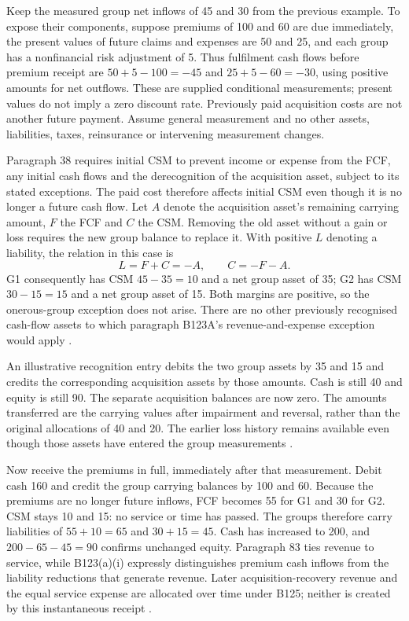 Keep the measured group net inflows of 45 and 30 from the previous example.
To expose their components, suppose premiums of 100 and 60 are due immediately,
the present values of future claims and expenses are 50 and 25, and each
group has a nonfinancial risk adjustment of 5. Thus fulfilment cash flows
before premium receipt are $50+5-100=-45$ and $25+5-60=-30$, using positive
amounts for net outflows. These are supplied conditional measurements;
present values do not imply a zero discount rate. Previously paid acquisition
costs are not another future payment. Assume general measurement and no other
assets, liabilities, taxes, reinsurance or intervening measurement changes.

Paragraph 38 requires initial CSM to prevent income or expense from the FCF,
any initial cash flows and the derecognition of the acquisition asset, subject
to its stated exceptions. The paid cost therefore affects initial CSM even
though it is no longer a future cash flow. Let $A$ denote the acquisition
asset's remaining carrying amount, $F$ the FCF and $C$ the CSM. Removing the
old asset without a gain or loss requires the new group balance to replace it.
With positive $L$ denoting a liability, the relation in this case is
\[
 L=F+C=-A,\qquad C=-F-A.
\]
G1 consequently has CSM $45-35=10$ and a net group asset of 35; G2 has CSM
$30-15=15$ and a net group asset of 15. Both margins are positive, so the
onerous-group exception does not arise. There are no other previously
recognised cash-flow assets to which paragraph B123A's revenue-and-expense
exception would apply \citep[paragraphs 28C, 32, 38, 47 and B123A]{aasb17}.

An illustrative recognition entry debits the two group assets by 35 and 15
and credits the corresponding acquisition assets by those amounts. Cash is
still 40 and equity is still 90. The separate acquisition balances are now
zero. The amounts transferred are the carrying values after impairment and
reversal, rather than the original allocations of 40 and 20. The earlier
loss history remains available even though those assets have entered the
group measurements \citep[paragraphs 28C--28D and B35C]{aasb17}.

Now receive the premiums in full, immediately after that measurement. Debit
cash 160 and credit the group carrying balances by 100 and 60. Because the
premiums are no longer future inflows, FCF becomes 55 for G1 and 30 for G2.
CSM stays 10 and 15: no service or time has passed. The groups therefore carry
liabilities of $55+10=65$ and $30+15=45$. Cash has increased to 200, and
$200-65-45=90$ confirms unchanged equity. Paragraph 83 ties revenue to
service, while B123(a)(i) expressly distinguishes premium cash inflows from
the liability reductions that generate revenue. Later acquisition-recovery
revenue and the equal service expense are allocated over time under B125;
neither is created by this instantaneous receipt
\citep[paragraphs 40--41, 83--85 and B123--B125]{aasb17}.

